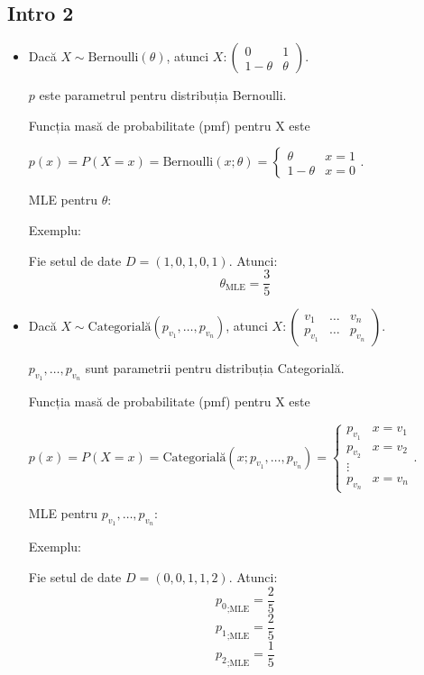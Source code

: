 \documentclass[12pt]{article}
\begin{document}
	\subsection{Intro 2}
	\begin{itemize}
		\item 	Dacă $X \sim \text{Bernoulli}(\theta)$, atunci $X: \begin{pmatrix}
		0 & 1\\
		1-\theta & \theta
		\end{pmatrix}$. 
		
		$p$ este parametrul pentru distribuția Bernoulli. 
		
		Funcția masă de probabilitate (pmf) pentru X este 
		
		$p(x) = P(X = x) = \text{Bernoulli}(x;\theta) = \begin{cases}
		\theta & x = 1\\
		1-\theta & x=0
		\end{cases}.$
		
		MLE pentru $\theta$:
		
		Exemplu:
		
		Fie setul de date $D = (1,0,1,0,1)$. Atunci:
		$$\theta_\text{MLE} = \frac{3}{5}$$
		
		\item 	Dacă $X \sim \text{Categorială}(p_{v_1},\dots,p_{v_n})$, atunci $X:\begin{pmatrix}
		v_1 & \dots & v_n\\
		p_{v_1} & \dots & p_{v_n}
		\end{pmatrix}$. 
		
		$p_{v_1},\dots,p_{v_n}$ sunt parametrii pentru distribuția Categorială. 
		
		Funcția masă de probabilitate (pmf) pentru X este 
		
		$p(x) = P(X = x) = \text{Categorială}(x;p_{v_1},\dots,p_{v_n}) = \begin{cases}
		p_{v_1} & x = v_1\\
		p_{v_2} & x = v_2 \\
		\vdots\\
		p_{v_n} & x = v_n
		\end{cases}.$
		
		MLE pentru $p_{v_1},\dots,p_{v_n}$:
		
		Exemplu:
		
		Fie setul de date $D = (0,0,1,1,2)$. Atunci:
		$${p_0}_\text{;MLE} = \frac{2}{5}$$
		$${p_1}_\text{;MLE} = \frac{2}{5}$$
		$${p_2}_\text{;MLE} = \frac{1}{5}$$
		
	\end{itemize}
\end{document}
